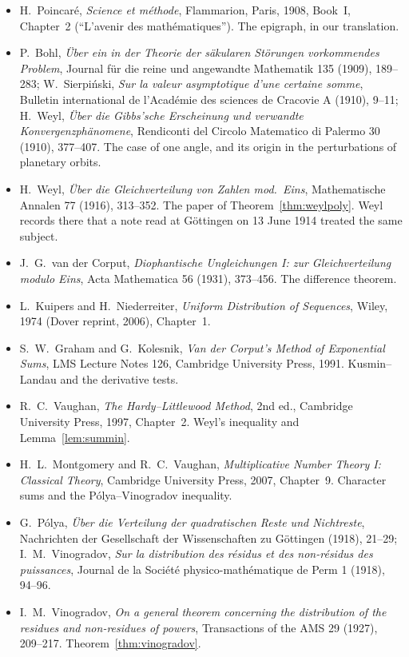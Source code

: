 \begin{itemize}
\item H.~Poincaré, \emph{Science et méthode}, Flammarion, Paris, 1908, Book~I, Chapter~2 (``L'avenir des mathématiques''). The epigraph, in our translation.
\item P.~Bohl, \emph{Über ein in der Theorie der säkularen Störungen vorkommendes Problem}, Journal für die reine und angewandte Mathematik 135 (1909), 189--283; W.~Sierpiński, \emph{Sur la valeur asymptotique d'une certaine somme}, Bulletin international de l'Académie des sciences de Cracovie A (1910), 9--11; H.~Weyl, \emph{Über die Gibbs'sche Erscheinung und verwandte Konvergenzphänomene}, Rendiconti del Circolo Matematico di Palermo 30 (1910), 377--407. The case of one angle, and its origin in the perturbations of planetary orbits.
\item H.~Weyl, \emph{Über die Gleichverteilung von Zahlen mod.\ Eins}, Mathematische Annalen 77 (1916), 313--352. The paper of Theorem~\ref{thm:weylpoly}. Weyl records there that a note read at Göttingen on 13 June 1914 treated the same subject.
\item J.~G.~van der Corput, \emph{Diophantische Ungleichungen I: zur Gleichverteilung modulo Eins}, Acta Mathematica 56 (1931), 373--456. The difference theorem.
\item L.~Kuipers and H.~Niederreiter, \emph{Uniform Distribution of Sequences}, Wiley, 1974 (Dover reprint, 2006), Chapter~1.
\item S.~W.~Graham and G.~Kolesnik, \emph{Van der Corput's Method of Exponential Sums}, LMS Lecture Notes 126, Cambridge University Press, 1991. Kusmin--Landau and the derivative tests.
\item R.~C.~Vaughan, \emph{The Hardy--Littlewood Method}, 2nd ed., Cambridge University Press, 1997, Chapter~2. Weyl's inequality and Lemma~\ref{lem:summin}.
\item H.~L.~Montgomery and R.~C.~Vaughan, \emph{Multiplicative Number Theory I: Classical Theory}, Cambridge University Press, 2007, Chapter~9. Character sums and the Pólya--Vinogradov inequality.
\item G.~Pólya, \emph{Über die Verteilung der quadratischen Reste und Nichtreste}, Nachrichten der Gesellschaft der Wissenschaften zu Göttingen (1918), 21--29; I.~M.~Vinogradov, \emph{Sur la distribution des résidus et des non-résidus des puissances}, Journal de la Société physico-mathématique de Perm 1 (1918), 94--96.
\item I.~M.~Vinogradov, \emph{On a general theorem concerning the distribution of the residues and non-residues of powers}, Transactions of the AMS 29 (1927), 209--217. Theorem~\ref{thm:vinogradov}.

\end{itemize}
